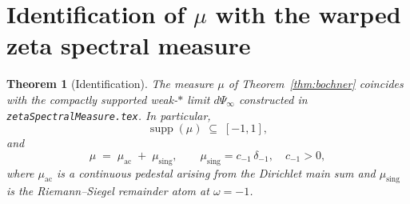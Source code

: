 \documentclass[11pt]{article}
\newtheorem{theorem}{Theorem}
\theoremstyle{definition}
\DeclareMathOperator{\supp}{supp}
\begin{document}
\section{Identification of $\mu$ with the warped zeta spectral measure}
\label{sec:identify}

\begin{theorem}[Identification]\label{thm:identify}
The measure $\mu$ of Theorem~\ref{thm:bochner} coincides with the
compactly supported weak-$\ast$ limit $d\Psi_{\infty}$ constructed in
\texttt{zetaSpectralMeasure.tex}. In particular,
\begin{equation}\label{eq:supp}
\supp(\mu) \;\subseteq\; [-1,1],
\end{equation}
and
\[
\mu \;=\; \mu_{\mathrm{ac}} \;+\; \mu_{\mathrm{sing}},\qquad
\mu_{\mathrm{sing}}=c_{-1}\,\delta_{-1},\quad c_{-1}>0,
\]
where $\mu_{\mathrm{ac}}$ is a continuous pedestal arising from the
Dirichlet main sum and $\mu_{\mathrm{sing}}$ is the Riemann--Siegel
remainder atom at $\omega=-1$.
\end{theorem}
\end{document}
